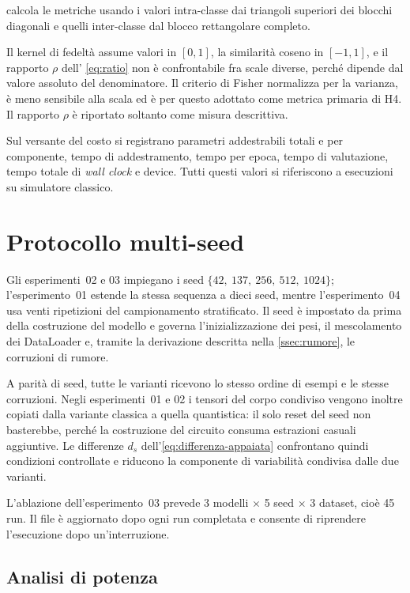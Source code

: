  calcola le metriche usando i valori
intra-classe dai triangoli superiori dei blocchi diagonali e quelli inter-classe
dal blocco rettangolare completo.

Il kernel di fedeltà assume valori in $[0,1]$, la similarità coseno in $[-1,1]$,
e il rapporto $\rho$ dell'
\cref{eq:ratio} non è confrontabile fra scale diverse, perché dipende dal valore
assoluto del denominatore. Il criterio di Fisher normalizza per la varianza, è
meno sensibile alla scala ed è per questo adottato come metrica primaria di H4.
Il rapporto $\rho$ è riportato soltanto come misura descrittiva.

Sul versante del costo si registrano parametri addestrabili totali e per
componente, tempo di addestramento, tempo per epoca, tempo di valutazione, tempo
totale di \emph{wall clock} e device. Tutti questi valori si riferiscono a
esecuzioni su simulatore classico.

\section{Protocollo multi-seed}
\label{sec:multiseed}

Gli esperimenti~02 e 03 impiegano i seed $\{42,\ 137,\ 256,\ 512,\ 1024\}$;
l'esperimento~01 estende la stessa sequenza a dieci seed, mentre l'esperimento~04
usa venti ripetizioni del campionamento stratificato. Il seed è impostato da
 prima della costruzione del modello e governa
l'inizializzazione dei pesi, il mescolamento dei DataLoader e, tramite la
derivazione descritta nella \cref{ssec:rumore}, le corruzioni di rumore.

A parità di seed, tutte le varianti ricevono lo stesso ordine di esempi e le
stesse corruzioni. Negli esperimenti~01 e 02 i
tensori del corpo condiviso vengono inoltre copiati dalla variante classica a
quella quantistica: il solo reset del seed non basterebbe, perché la costruzione
del circuito consuma estrazioni casuali aggiuntive. Le differenze $d_s$
dell'\cref{eq:differenza-appaiata}
confrontano quindi condizioni controllate e riducono la componente di variabilità
condivisa dalle due varianti.

L'ablazione dell'esperimento~03 prevede 3 modelli $\times$ 5 seed $\times$ 3
dataset, cioè 45 run. Il file  è aggiornato dopo ogni
run completata e consente di riprendere l'esecuzione dopo un'interruzione.

\subsection{Analisi di potenza}
\label{ssec:potenza}

